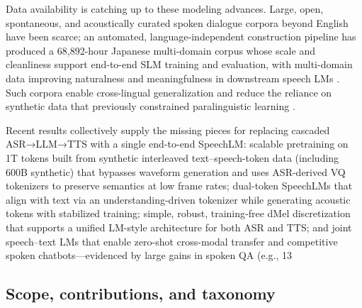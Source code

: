Data availability is catching up to these modeling advances. Large, open, spontaneous, and acoustically curated spoken dialogue corpora beyond English have been scarce; an automated, language-independent construction pipeline has produced a 68,892-hour Japanese multi-domain corpus whose scale and cleanliness support end-to-end SLM training and evaluation, with multi-domain data improving naturalness and meaningfulness in downstream speech LMs \cite{nakata2024jchatjapaneselargescalespokendialoguecor}. Such corpora enable cross-lingual generalization and reduce the reliance on synthetic data that previously constrained paralinguistic learning \cite{wang2024blspemotowardsempatheticlargespeechlangu}.



Recent results collectively supply the missing pieces for replacing cascaded ASR→LLM→TTS with a single end-to-end SpeechLM: scalable pretraining on 1T tokens built from synthetic interleaved text–speech-token data (including 600B synthetic) that bypasses waveform generation and uses ASR-derived VQ tokenizers to preserve semantics at low frame rates; dual-token SpeechLMs that align with text via an understanding-driven tokenizer while generating acoustic tokens with stabilized training; simple, robust, training‑free dMel discretization that supports a unified LM-style architecture for both ASR and TTS; and joint speech–text LMs that enable zero-shot cross-modal transfer and competitive spoken chatbots—evidenced by large gains in spoken QA (e.g., 13%



\subsection{Scope, contributions, and taxonomy} \label{subsec:Scope, contributions, and taxonomy}

